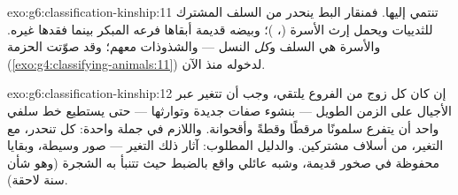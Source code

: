 \begin{solution}{exo:g6:classification-kinship:11}
تنتمي إليها. فمنقار البط ينحدر من السلف المشترك للثدييات ويحمل
إرث الأسرة (، )؛ وبيضه  قديمة أبقاها فرعه المبكر
بينما فقدها غيره. والأسرة هي السلف و\emph{كل} النسل --- والشذوذات
معهم؛ وقد صوّتت الحزمة
(\cref{exo:g4:classifying-animals:11}) لدخوله منذ الآن.
\end{solution}

\begin{solution}{exo:g6:classification-kinship:12}
إن كان كل زوج من الفروع يلتقي، وجب أن تتغير  عبر الأجيال
على الزمن الطويل --- بنشوء صفات جديدة وتوارثها --- حتى يستطيع خط
سلفي واحد أن يتفرع سلمونًا مرقطًا وقطةً وأقحوانة. واللازم في جملة
واحدة: كل  تنحدر، مع التغير، من أسلاف مشتركين.
والدليل المطلوب: آثار ذلك التغير --- صور وسيطة، وبقايا محفوظة في
صخور قديمة، وشبه عائلي واقع بالضبط حيث تتنبأ به الشجرة (وهو شأن
سنة لاحقة).
\end{solution}

